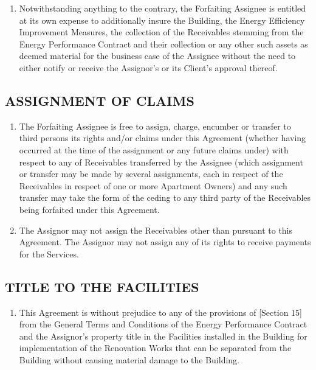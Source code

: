 \documentclass[a4paper]{article}
\begin{document}
\begin{multicols}{2}
\begin{enumerate}
  \item{Notwithstanding anything to the contrary, the Forfaiting
      Assignee is entitled at its own expense to additionally insure
      the Building, the Energy Efficiency Improvement Measures, the
      collection of the Receivables stemming from the Energy
      Performance Contract and their collection or any other such
      assets as deemed material for the business case of the Assignee
      without the need to either notify or receive the Assignor’s or
      its Client’s approval thereof.}
  \end{enumerate}

  \subsection{ASSIGNMENT OF CLAIMS }

  \begin{enumerate}
  \item{The Forfaiting Assignee is free to assign, charge, encumber or
      transfer to third persons its rights and/or claims under this
      Agreement (whether having occurred at the time of the assignment
      or any future claims under) with respect to any of Receivables
      transferred by the Assignee (which assignment or transfer may be
      made by several assignments, each in respect of the Receivables
      in respect of one or more Apartment Owners) and any such
      transfer may take the form of the ceding to any third party of
      the Receivables being forfaited under this Agreement. }

  \item{The Assignor may not assign the Receivables other than
      pursuant to this Agreement. The Assignor may not assign any of
      its rights to receive payments for the Services.}
  \end{enumerate}

  \subsection{TITLE TO THE FACILITIES}

  \begin{enumerate}
  \item{This Agreement is without prejudice to any of the provisions
      of {[}Section 15{]} from the General Terms and Conditions of the
      Energy Performance Contract and the Assignor’s property title in
      the Facilities installed in the Building for implementation of
      the Renovation Works that can be separated from the Building
      without causing material damage to the Building.}


\end{enumerate}
\end{multicols}
\end{document}
